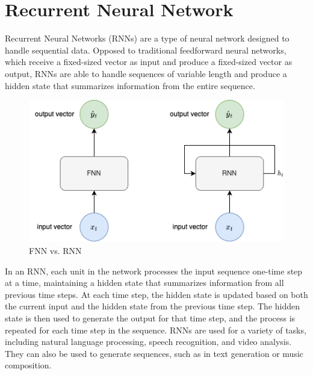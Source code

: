     \section{Recurrent Neural Network}
    \label{sec:rnn-background}

        Recurrent Neural Networks (RNNs) are a type of neural network designed to handle sequential data.
        Opposed to traditional feedforward neural networks, which receive a fixed-sized vector as input and produce a fixed-sized vector as output, 
        RNNs are able to handle sequences of variable length and produce a hidden state that summarizes information from the entire sequence.
        \begin{figure}[h!]
            \centering
            \includegraphics[scale=0.5]{figures/FNN_vs_RNN.drawio.png}
            \caption{FNN vs. RNN}
            \label{fig:fnn-vs-rnn}
        \end{figure}
        In an RNN, each unit in the network processes the input sequence one-time step at a time, maintaining a hidden state that summarizes information from all previous time steps. At each time step, the hidden state is updated based on both the current input and the hidden state from the previous time step. The hidden state is then used to generate the output for that time step, and the process is repeated for each time step in the sequence.
        RNNs are used for a variety of tasks, including natural language processing, speech recognition, and video analysis. They can also be used to generate sequences, such as in text generation or music composition.


